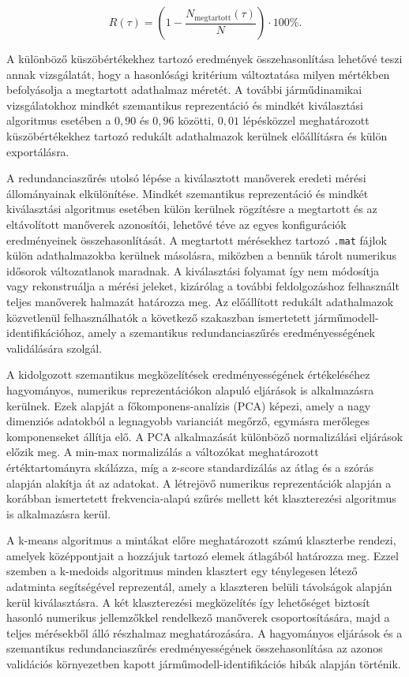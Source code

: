 \documentclass[12pt,a4paper,onehalfspacing, oneside]{book} %
\begin{document}
\begin{equation}
R(\tau)=\left(1-\frac{N_{\mathrm{megtartott}}(\tau)}{N}\right)\cdot100\%.
\label{eq:redukcio_merteke}
\end{equation}

A különböző küszöbértékekhez tartozó eredmények összehasonlítása lehetővé teszi annak vizsgálatát, hogy a hasonlósági kritérium változtatása milyen mértékben befolyásolja a megtartott adathalmaz méretét. A további járműdinamikai vizsgálatokhoz mindkét szemantikus reprezentáció és mindkét kiválasztási algoritmus esetében a $0{,}90$ és $0{,}96$ közötti, $0{,}01$ lépésközzel meghatározott küszöbértékekhez tartozó redukált adathalmazok kerülnek előállításra és külön exportálásra. 

A redundanciaszűrés utolsó lépése a kiválasztott manőverek eredeti mérési állományainak elkülönítése. Mindkét szemantikus reprezentáció és mindkét kiválasztási algoritmus esetében külön kerülnek rögzítésre a megtartott és az eltávolított manőverek azonosítói, lehetővé téve az egyes konfigurációk eredményeinek összehasonlítását. A megtartott mérésekhez tartozó \texttt{.mat} fájlok külön adathalmazokba kerülnek másolásra, miközben a bennük tárolt numerikus idősorok változatlanok maradnak. A kiválasztási folyamat így nem módosítja vagy rekonstruálja a mérési jeleket, kizárólag a további feldolgozáshoz felhasznált teljes manőverek halmazát határozza meg. Az előállított redukált adathalmazok közvetlenül felhasználhatók a következő szakaszban ismertetett járműmodell-identifikációhoz, amely a szemantikus redundanciaszűrés eredményességének validálására szolgál.

A kidolgozott szemantikus megközelítések eredményességének értékeléséhez hagyományos, numerikus reprezentációkon alapuló eljárások is alkalmazásra kerülnek. Ezek alapját a főkomponens-analízis (PCA) képezi, amely a nagy dimenziós adatokból a legnagyobb varianciát megőrző, egymásra merőleges komponenseket állítja elő. A PCA alkalmazását különböző normalizálási eljárások előzik meg. A min-max normalizálás a változókat meghatározott értéktartományra skálázza, míg a z-score standardizálás az átlag és a szórás alapján alakítja át az adatokat. A létrejövő numerikus reprezentációk alapján a korábban ismertetett frekvencia-alapú szűrés mellett két klaszterezési algoritmus is alkalmazásra kerül.

A k-means algoritmus a mintákat előre meghatározott számú klaszterbe rendezi, amelyek középpontjait a hozzájuk tartozó elemek átlagából határozza meg. Ezzel szemben a k-medoids algoritmus minden klasztert egy ténylegesen létező adatminta segítségével reprezentál, amely a klaszteren belüli távolságok alapján kerül kiválasztásra. A két klaszterezési megközelítés így lehetőséget biztosít hasonló numerikus jellemzőkkel rendelkező manőverek csoportosítására, majd a teljes mérésekből álló részhalmaz meghatározására. A hagyományos eljárások és a szemantikus redundanciaszűrés eredményességének összehasonlítása az azonos validációs környezetben kapott járműmodell-identifikációs hibák alapján történik.
\end{document}
